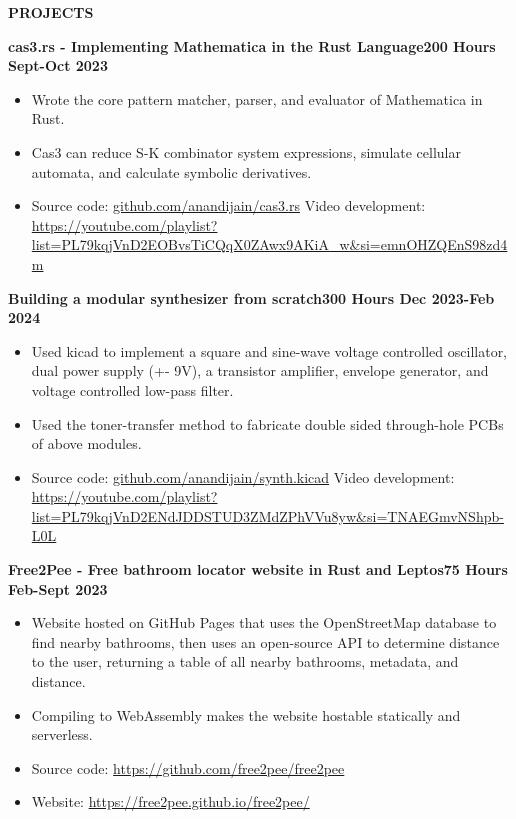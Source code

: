 \documentclass[10pt]{extarticle}
\begin{document}
\begin{list}{}{\setlength{\leftmargin}{1.4in}\setlength{\labelsep}{0.1cm}\setlength{\labelwidth}{1.18in}}
\item[\bf PROJECTS\hfill]

{\bf cas3.rs - Implementing Mathematica in the Rust Language}\hfill {\bf 200 Hours Sept-Oct 2023}
\begin{itemize}[noitemsep]
	\item Wrote the core pattern matcher, parser, and evaluator of Mathematica in Rust.
	\item Cas3 can reduce S-K combinator system expressions, simulate cellular automata, and calculate symbolic derivatives.
	\item Source code: \url{github.com/anandijain/cas3.rs} Video development: \url{https://youtube.com/playlist?list=PL79kqjVnD2EOBvsTiCQqX0ZAwx9AKiA_w&si=emnOHZQEnS98zd4m}
\end{itemize}

{\bf Building a modular synthesizer from scratch}\hfill {\bf 300 Hours Dec 2023-Feb 2024}
\begin{itemize}[noitemsep]
	\item Used kicad to implement a square and sine-wave voltage controlled oscillator, dual power supply (+- 9V), a transistor amplifier, envelope generator, and voltage controlled low-pass filter.
	\item Used the toner-transfer method to fabricate double sided through-hole PCBs of above modules.
	\item Source code:  \url{github.com/anandijain/synth.kicad} Video development: \url{https://youtube.com/playlist?list=PL79kqjVnD2ENdJDDSTUD3ZMdZPhVVu8yw&si=TNAEGmvNShpb-L0L}
\end{itemize}

{\bf Free2Pee - Free bathroom locator website in Rust and Leptos}\hfill {\bf 75 Hours Feb-Sept 2023}
\begin{itemize}[noitemsep]
	\item Website hosted on GitHub Pages that uses the OpenStreetMap database to find nearby bathrooms, then uses an open-source API to determine distance to the user, returning a table of all nearby bathrooms, metadata, and distance.
	\item Compiling to WebAssembly makes the website hostable statically and serverless.
	\item Source code: \url{https://github.com/free2pee/free2pee}
	\item Website: \url{https://free2pee.github.io/free2pee/}
\end{itemize}


\end{list}
\end{document}
